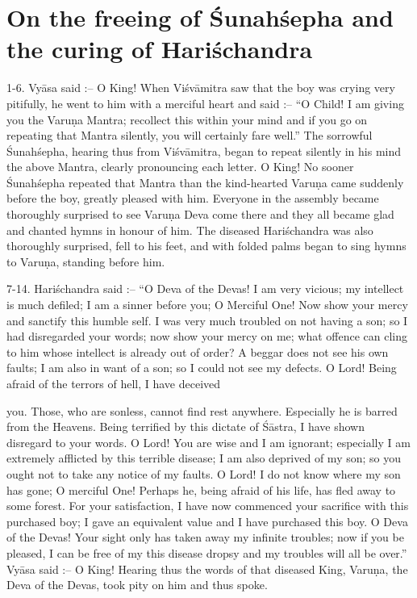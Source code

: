 \chapter{On the freeing of \'Sunah\'sepha and the curing of Hari\'schandra}

1-6. Vy\=asa said :-- O King! When Vi\'sv\=amitra saw that the boy was crying very pitifully, he went to him with a merciful heart and said :-- ``O Child! I am giving you the Varu\d{n}a Mantra; recollect this within your mind and if you go on repeating that Mantra silently, you will certainly fare well.'' The sorrowful \'Sunah\'sepha, hearing thus from Vi\'sv\=amitra, began to repeat silently in his mind the above Mantra, clearly pronouncing each letter. O King! No sooner \'Sunah\'sepha repeated that Mantra than the kind-hearted Varu\d{n}a came suddenly before the boy, greatly pleased with him. Everyone in the assembly became thoroughly surprised to see Varu\d{n}a Deva come there and they all became glad and chanted hymns in honour of him. The diseased Hari\'schandra was also thoroughly surprised, fell to his feet, and with folded palms began to sing hymns to Varu\d{n}a, standing before him.

7-14. Hari\'schandra said :-- ``O Deva of the Devas! I am very vicious; my intellect is much defiled; I am a sinner before you; O Merciful One! Now show your mercy and sanctify this humble self. I was very much troubled on not having a son; so I had disregarded your words; now show your mercy on me; what offence can cling to him whose intellect is already out of order? A beggar does not see his own faults; I am also in want of a son; so I could not see my defects. O Lord! Being afraid of the terrors of hell, I have deceived

you. Those, who are sonless, cannot find rest anywhere. Especially he is barred from the Heavens. Being terrified by this dictate of \'S\=astra, I have shown disregard to your words. O Lord! You are wise and I am ignorant; especially I am extremely afflicted by this terrible disease; I am also deprived of my son; so you ought not to take any notice of my faults. O Lord! I do not know where my son has gone; O merciful One! Perhaps he, being afraid of his life, has fled away to some forest. For your satisfaction, I have now commenced your sacrifice with this purchased boy; I gave an equivalent value and I have purchased this boy. O Deva of the Devas! Your sight only has taken away my infinite troubles; now if you be pleased, I can be free of my this disease dropsy and my troubles will all be over.'' Vy\=asa said :-- O King! Hearing thus the words of that diseased King, Varu\d{n}a, the Deva of the Devas, took pity on him and thus spoke.

